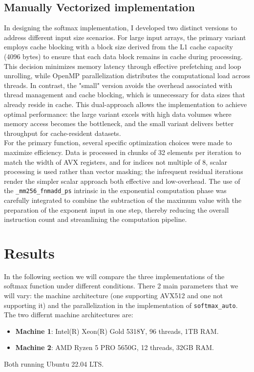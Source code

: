 \documentclass[10pt]{article}
\begin{document}
\subsection{Manually Vectorized implementation}
In designing the softmax implementation, I developed two distinct versions to address different input size scenarios. For large input arrays, the primary variant employs cache blocking with a block size derived from the L1 cache capacity (4096 bytes) to ensure that each data block remains in cache during processing. This decision minimizes memory latency through effective prefetching and loop unrolling, while OpenMP parallelization distributes the computational load across threads. In contrast, the "small" version avoids the overhead associated with thread management and cache blocking, which is unnecessary for data sizes that already reside in cache. This dual-approach allows the implementation to achieve optimal performance: the large variant excels with high data volumes where memory access becomes the bottleneck, and the small variant delivers better throughput for cache-resident datasets. \\

For the primary function, several specific optimization choices were made to maximize efficiency. Data is processed in chunks of 32 elements per iteration to match the width of AVX registers, and for indices not multiple of 8, scalar processing is used rather than vector masking; the infrequent residual iterations render the simpler scalar approach both effective and low-overhead. The use of the \texttt{\_mm256\_fnmadd\_ps} intrinsic in the exponential computation phase was carefully integrated to combine the subtraction of the maximum value with the preparation of the exponent input in one step, thereby reducing the overall instruction count and streamlining the computation pipeline.

\section{Results}
In the following section we will compare the three implementations of the softmax function under different conditions. There 2 main parameters that we will vary: the machine architecture (one supporting AVX512 and one not supporting it) and the parallelization in the implementation of \texttt{softmax\_auto}. The two differnt machine architectures are:
\begin{itemize}
  \item \textbf{Machine 1}: Intel(R) Xeon(R) Gold 5318Y, 96 threads, 1TB RAM.
  \item \textbf{Machine 2}: AMD Ryzen 5 PRO 5650G, 12 threads, 32GB RAM.
\end{itemize}
Both running Ubuntu 22.04 LTS. \\
\end{document}
